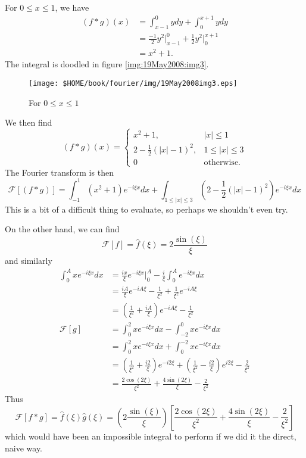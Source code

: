\begin{ex}
For $0\leq x\leq 1$, we have
\begin{subequations}
\begin{align}
(f*g)(x) &= \int^{0}_{x-1}ydy + \int^{x+1}_{0}ydy\\
&= \frac{-1}{2}y^2\Big|^{0}_{x-1} +
  \frac{1}{2}y^2\Big|^{x+1}_{0}\\
&= x^2 + 1.
\end{align}
\end{subequations}
The integral is doodled in figure \eqref{img:19May2008:img3}.
\begin{figure}[hb!]
\texttt{[image: \$HOME/book/fourier/img/19May2008img3.eps]}
\caption{For $0\leq x\leq 1$}\label{img:19May2008:img3}
\end{figure}

We then find
\begin{equation}
(f*g)(x) = \begin{cases} x^2+1, &|x|\leq1\\
2 - \frac{1}{2}(|x|-1)^2, & 1\leq|x|\leq3\\
0 &\text{otherwise}.
\end{cases}
\end{equation}
The Fourier transform is then
\begin{equation}
\mathcal{F}[(f*g)] = \int^{1}_{-1}( x^2+1)e^{-i\xi x}dx + \int_{1\leq|x|\leq3}(2
- \frac{1}{2}(|x|-1)^2)e^{-i\xi x}dx
\end{equation}
This is a bit of a difficult thing to evaluate, so perhaps
we shouldn't even try.

On the other hand, we can find
\begin{equation}
\mathcal{F}[f] = \widehat{f}(\xi) = 2\frac{\sin(\xi)}{\xi}
\end{equation}
and similarly
\begin{subequations}
\begin{align}
\int^{A}_{0}xe^{-i\xi x}dx &= \frac{ix}{\xi}e^{-i\xi
  x}\Big|^{A}_{0} - \frac{i}{\xi}\int^{A}_{0}e^{-i\xi x}dx\\
&= \frac{iA}{\xi}e^{-iA\xi} - \frac{1}{\xi^2} + \frac{1}{\xi^2}e^{-iA\xi}\\
&= \left(\frac{1}{\xi^2} + \frac{iA}{\xi}\right)e^{-iA\xi} - \frac{1}{\xi^2}\\ 
\mathcal{F}[g] &= \int^{2}_{0}xe^{-i\xi x}dx -\int^{0}_{-2}xe^{-i \xi x}dx\\ 
&= \int^{2}_{0}xe^{-i\xi x}dx +\int^{-2}_{0}xe^{-i \xi x}dx\\ 
&= \left(\frac{1}{\xi^2}+\frac{i2}{\xi}\right)e^{-i2\xi} +
\left(\frac{1}{\xi^2} - \frac{i2}{\xi}\right)e^{i2\xi} -
\frac{2}{\xi^2}\\
&= \frac{2\cos(2\xi)}{\xi^2} + \frac{4\sin(2\xi)}{\xi} - \frac{2}{\xi^2}
\end{align}
\end{subequations}
Thus
\begin{equation}
\mathcal{F}[f*g] = \widehat{f}(\xi)\widehat{g}(\xi) =
  \left(2\frac{\sin(\xi)}{\xi}\right)\left[\frac{2\cos(2\xi)}{\xi^2} + \frac{4\sin(2\xi)}{\xi} - \frac{2}{\xi^2}\right]
\end{equation}
which would have been an impossible integral to perform if
we did it the direct, naive way.
\end{ex}
